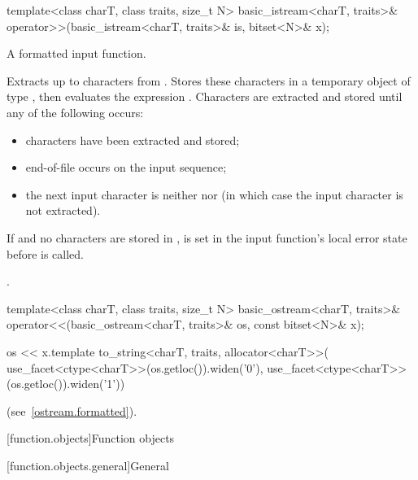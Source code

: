 %
\begin{itemdecl}
template<class charT, class traits, size_t N>
  basic_istream<charT, traits>&
    operator>>(basic_istream<charT, traits>& is, bitset<N>& x);
\end{itemdecl}

\begin{itemdescr}
\pnum
A formatted input function.

\pnum
\effects
Extracts up to  characters from .
Stores these characters in a temporary object  of type
,
then evaluates the expression
.
Characters are extracted and stored until any of the following occurs:
\begin{itemize}
\item
{} characters have been extracted and stored;
\item
{}%
end-of-file occurs on the input sequence;
\item
the next input character is neither
nor
(in which case the input character is not extracted).
\end{itemize}

\pnum
If  and no characters are stored in ,
 is set in the input function's local error state
before  is called.

\pnum
\returns
{}.
\end{itemdescr}

%
\begin{itemdecl}
template<class charT, class traits, size_t N>
  basic_ostream<charT, traits>&
    operator<<(basic_ostream<charT, traits>& os, const bitset<N>& x);
\end{itemdecl}

\begin{itemdescr}
\pnum
\returns
\begin{codeblock}
os << x.template to_string<charT, traits, allocator<charT>>(
  use_facet<ctype<charT>>(os.getloc()).widen('0'),
  use_facet<ctype<charT>>(os.getloc()).widen('1'))
\end{codeblock}
(see~\ref{ostream.formatted}).
\end{itemdescr}

[function.objects]{Function objects}

[function.objects.general]{General}

